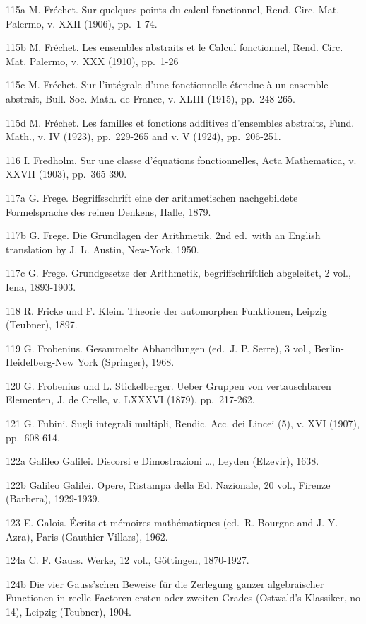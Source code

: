115a M. Fréchet. Sur quelques points du calcul fonctionnel, Rend. Circ. Mat. Palermo, v. XXII (1906), pp.~1-74.

115b M. Fréchet. Les ensembles abstraits et le Calcul fonctionnel, Rend. Circ. Mat. Palermo, v. XXX (1910), pp.~1-26

115c M. Fréchet. Sur l'intégrale d'une fonctionnelle étendue à un ensemble abstrait, Bull. Soc. Math. de France, v. XLIII (1915), pp.~248-265.

115d M. Fréchet. Les familles et fonctions additives d'ensembles abstraits, Fund. Math., v. IV (1923), pp.~229-265 and v. V (1924), pp.~206-251.

116 I. Fredholm. Sur une classe d'équations fonctionnelles, Acta Mathematica, v. XXVII (1903), pp.~365-390.

117a G. Frege. Begriffsschrift eine der arithmetischen nachgebildete Formelsprache des reinen Denkens, Halle, 1879.

117b G. Frege. Die Grundlagen der Arithmetik, 2nd ed.~with an English translation by J. L. Austin, New-York, 1950.

117c G. Frege. Grundgesetze der Arithmetik, begriffschriftlich abgeleitet, 2 vol., Iena, 1893-1903.

118 R. Fricke und F. Klein. Theorie der automorphen Funktionen, Leipzig (Teubner), 1897.

119 G. Frobenius. Gesammelte Abhandlungen (ed.~J. P. Serre), 3 vol., Berlin-Heidelberg-New York (Springer), 1968.

120 G. Frobenius und L. Stickelberger. Ueber Gruppen von vertauschbaren Elementen, J. de Crelle, v. LXXXVI (1879), pp.~217-262.

121 G. Fubini. Sugli integrali multipli, Rendic. Acc. dei Lincei (5), v. XVI (1907), pp.~608-614.

122a Galileo Galilei. Discorsi e Dimostrazioni \ldots, Leyden (Elzevir), 1638.

122b Galileo Galilei. Opere, Ristampa della Ed. Nazionale, 20 vol., Firenze (Barbera), 1929-1939.

123 E. Galois. Écrits et mémoires mathématiques (ed.~R. Bourgne and J. Y. Azra), Paris (Gauthier-Villars), 1962.

124a C. F. Gauss. Werke, 12 vol., Göttingen, 1870-1927.

124b Die vier Gauss'schen Beweise für die Zerlegung ganzer algebraischer Functionen in reelle Factoren ersten oder zweiten Grades (Ostwald's Klassiker, no 14), Leipzig (Teubner), 1904.

